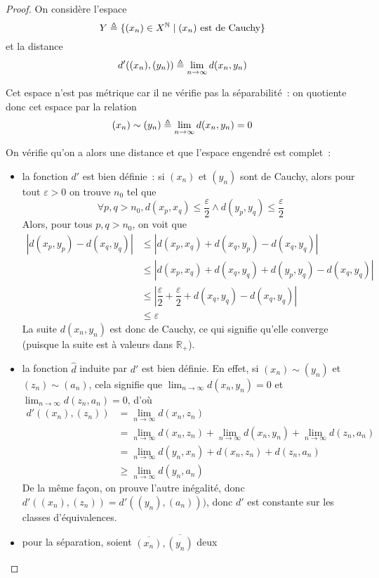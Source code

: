 \begin{proof}
  On considère l'espace
  \[Y \triangleq \{(x_n)\in X^{\mathbb N}\mid (x_n)\text{ est de Cauchy}\}\]
  et la distance
  \[d'((x_n),(y_n)) \triangleq \lim_{n \to \infty} d(x_n,y_n)\]

  Cet espace n'est pas métrique car il ne vérifie pas la séparabilité~: on
  quotiente donc cet espace par la relation
  \[(x_n)\sim (y_n) \triangleq \lim_{n\to\infty} d(x_n,y_n) = 0\]

  On vérifie qu'on a alors une distance et que l'espace engendré est complet~:
  \begin{itemize}
  \item la fonction $d'$ est bien définie~: si $(x_n)$ et $(y_n)$ sont de
    Cauchy, alors pour tout $\varepsilon > 0$ on trouve $n_0$ tel que
    \[\forall p,q > n_0, d(x_p,x_q) \leq \dfrac{\varepsilon}{2}
    \land d(y_p,y_q) \leq \dfrac{\varepsilon}{2}\]
    Alors, pour tous $p,q > n_0$, on voit que
    \begin{align*}
      |d(x_p,y_p) - d(x_q,y_q)| &\leq |d(x_p,x_q) + d(x_q,y_p) - d(x_q,y_q)|\\
      &\leq |d(x_p,x_q) + d(x_q,y_q) + d(y_p,y_q) - d(x_q,y_q)|\\
      &\leq \left|\dfrac{\varepsilon}{2} + \dfrac{\varepsilon}{2}
      + d(x_q,y_q) - d(x_q,y_q)\right|\\
      &\leq \varepsilon
    \end{align*}
    La suite $d(x_n,y_n)$ est donc de Cauchy, ce qui signifie qu'elle converge
    (puisque la suite est à valeurs dans $\mathbb R_+$).
  \item la fonction $\hat d$ induite par $d'$ est bien définie. En effet, si
    $(x_n)\sim (y_n)$ et $(z_n)\sim (a_n)$, cela signifie que
    $\displaystyle\lim_{n\to\infty} d(x_n,y_n) = 0$ et
    $\displaystyle\lim_{n\to\infty}d(z_n,a_n) = 0$, d'où
    \begin{align*}
      d'((x_n),(z_n)) &= \displaystyle\lim_{n \to \infty} d(x_n,z_n)\\
      &= \lim_{n\to \infty} d(x_n,z_n) + \lim_{n\to\infty} d(x_n,y_n) +
      \lim_{n\to \infty} d(z_n,a_n)\\
      &= \lim_{n\to\infty} d(y_n,x_n) + d(x_n,z_n) + d(z_n,a_n)\\
      &\geq \lim_{n\to \infty} d(y_n,a_n)
    \end{align*}
    De la même façon, on prouve l'autre inégalité, donc
    $d'((x_n),(z_n)) = d'((y_n),(a_n)))$, donc $d'$ est constante sur les
    classes d'équivalences.
  \item pour la séparation, soient $\overline{(x_n)},\overline{(y_n)}$ deux

\end{itemize}
\end{proof}
